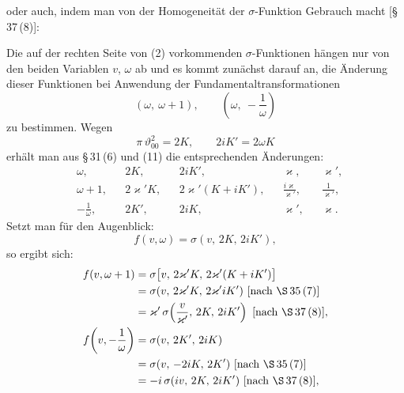 

oder auch, indem man von der Homogeneität der $\sigma$-Funktion Gebrauch macht [\S\,37\,(8)]:


Die auf der rechten Seite von (2) vorkommenden $\sigma$-Funktionen hängen nur von den beiden Variablen $v$, $\omega$ ab und es kommt zunächst darauf an, die Änderung dieser Funktionen bei Anwendung der Fundamentaltransformationen
\[
(\omega,\ \omega+1), \qquad \left(\omega,\ -\frac{1}{\omega}\right)
\]
zu bestimmen. Wegen
\[
\pi\,\vartheta_{00}^{2}=2K, \qquad 2iK'=2\omega K
\]
erhält man aus \S\,31\,(6) und (11) die entsprechenden Änderungen:
\[
\begin{aligned}
&\omega, && 2K, && 2iK', && \varkappa, && \varkappa',\\
&\omega+1, && 2\varkappa'K, && 2\varkappa'(K+iK'), && \frac{i\varkappa}{\varkappa'}, && \frac{1}{\varkappa'},\\
&-\frac{1}{\omega}, && 2K', && 2iK, && \varkappa', && \varkappa.
\end{aligned}
\]
Setzt man für den Augenblick:
\[
f(v,\omega)=\sigma(v,\,2K,\,2iK'),
\]
so ergibt sich:
\[
\begin{aligned}
f(v,\omega+1)&=\sigma\bigl[v,\,2\varkappa'K,\,2\varkappa'(K+iK')\bigr]\\
&=\sigma(v,\,2\varkappa'K,\,2\varkappa'iK')\ \text{[nach \S\,35\,(7)]}\\
&=\varkappa'\,\sigma\!\left(\frac{v}{\varkappa'},\,2K,\,2iK'\right)\ \text{[nach \S\,37\,(8)]},\\
f\!\left(v,-\frac{1}{\omega}\right)&=\sigma(v,\,2K',\,2iK)\\
&=\sigma(v,\,-2iK,\,2K')\ \text{[nach \S\,35\,(7)]}\\
&=-i\,\sigma(iv,\,2K,\,2iK')\ \text{[nach \S\,37\,(8)]},
\end{aligned}
\]
